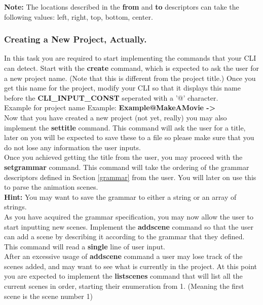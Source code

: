 \documentclass[a4paper]{article}
\begin{document}
	\noindent \textbf{Note:} The locations described in the \textbf{from} and \textbf{to} descriptors can take the following values: left, right, top, bottom, center.
	
	\subsubsection{Creating a New Project, Actually.}
	
	In this task you are required to start implementing the commands that your CLI can detect. Start with the \textbf{create} command, which is expected to ask the user for a new project name. (Note that this is different from the project title.) Once you get this name for the project, modify your CLI so that it displays this name before the \textbf{CLI\_INPUT\_CONST} seperated with a '@' character. \\
	
	Example for project name Example: \textbf{Example@MakeAMovie -\textgreater}\\
	
	Now that you have created a new project (not yet, really) you may also implement the \textbf{settitle} command. This command will ask the user for a title, later on you will be expected to save these to a file so please make sure that you do not lose any information the user inputs.\\
	
	Once you achieved getting the title from the user, you may proceed with the \textbf{setgrammar} command. This command will take the ordering of the grammar descriptors defined in Section \ref{grammar} from the user. You will later on use this to parse the animation scenes.\\
	
	\noindent \textbf{Hint:} You may want to save the grammar to either a string or an array of strings. \\
	
	As you have acquired the grammar specification, you may now allow the user to start inputting new scenes. Implement the \textbf{addscene} command so that the user can add a scene by describing it according to the grammar that they defined. This command will read a \textbf{single} line of user input. \\
	
	After an excessive usage of \textbf{addscene} command a user may lose track of the scenes added, and may want to see what is currently in the project. At this point you are expected to implement the \textbf{listscenes} command that will list all the current scenes in order, starting their enumeration from 1. (Meaning the first scene is the scene number 1) \\
	
\end{document}
